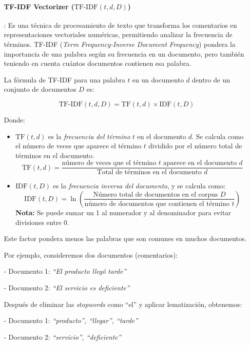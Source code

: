 \documentclass{matematicasud}
\begin{document}
\paragraph{TF-IDF Vectorizer (\(\text{TF-IDF}(t,d,D)\))}: Es una técnica de procesamiento de texto que transforma los comentarios en representaciones vectoriales numéricas, permitiendo analizar la frecuencia de términos. TF-IDF (\textit{Term Frequency-Inverse Document Frequency}) pondera la importancia de una palabra según su frecuencia en un documento, pero también teniendo en cuenta cuántos documentos contienen esa palabra.

La fórmula de TF-IDF para una palabra \(t\) en un documento \(d\) dentro de un conjunto de documentos \(D\) es:

\[
\text{TF-IDF}(t, d, D) = \text{TF}(t, d) \times \text{IDF}(t, D)
\]

Donde:
\begin{itemize}
    \item \(\text{TF}(t, d)\) es la \textit{frecuencia del término} \(t\) en el documento \(d\). Se calcula como el número de veces que aparece el término \(t\) dividido por el número total de términos en el documento.
    \[
    \text{TF}(t,d) = \frac{\text{número de veces que el término } t \text{ aparece en el documento } d}{\text{Total de términos en el documento } d}
    \]
    \item \(\text{IDF}(t, D)\) es la \textit{frecuencia inversa del documento}, y se calcula como:
    \[
    \text{IDF}(t,D) = \ln \left( \frac{\text{Número total de documentos en el corpus } D}{\text{número de documentos que contienen el término } t} \right)
    \]
\textbf{Nota:} Se puede sumar un 1 al numerador y al denominador para evitar divisiones entre 0.
\end{itemize}

Este factor pondera menos las palabras que son comunes en muchos documentos.

Por ejemplo, consideremos dos documentos (comentarios):

- Documento 1: \textit{``El producto llegó tarde''}

- Documento 2: \textit{``El servicio es deficiente''}

Después de eliminar las \textit{stopwords} como ``el'' y aplicar lematización, obtenemos:

- Documento 1: \textit{``producto'', ``llegar'', ``tarde''}

- Documento 2: \textit{``servicio'', ``deficiente''}
\end{document}
